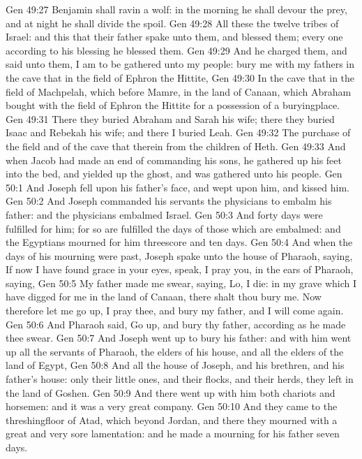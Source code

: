 \vs Gen 49:27 Benjamin shall ravin  a wolf: in the morning he shall devour the prey, and at night he shall divide the spoil.
\vs Gen 49:28 All these  the twelve tribes of Israel: and this  that their father spake unto them, and blessed them; every one according to his blessing he blessed them.
\vs Gen 49:29 And he charged them, and said unto them, I am to be gathered unto my people: bury me with my fathers in the cave that  in the field of Ephron the Hittite,
\vs Gen 49:30 In the cave that  in the field of Machpelah, which  before Mamre, in the land of Canaan, which Abraham bought with the field of Ephron the Hittite for a possession of a buryingplace.
\vs Gen 49:31 There they buried Abraham and Sarah his wife; there they buried Isaac and Rebekah his wife; and there I buried Leah.
\vs Gen 49:32 The purchase of the field and of the cave that  therein  from the children of Heth.
\vs Gen 49:33 And when Jacob had made an end of commanding his sons, he gathered up his feet into the bed, and yielded up the ghost, and was gathered unto his people.
\vs Gen 50:1 And Joseph fell upon his father's face, and wept upon him, and kissed him.
\vs Gen 50:2 And Joseph commanded his servants the physicians to embalm his father: and the physicians embalmed Israel.
\vs Gen 50:3 And forty days were fulfilled for him; for so are fulfilled the days of those which are embalmed: and the Egyptians mourned for him threescore and ten days.
\vs Gen 50:4 And when the days of his mourning were past, Joseph spake unto the house of Pharaoh, saying, If now I have found grace in your eyes, speak, I pray you, in the ears of Pharaoh, saying,
\vs Gen 50:5 My father made me swear, saying, Lo, I die: in my grave which I have digged for me in the land of Canaan, there shalt thou bury me. Now therefore let me go up, I pray thee, and bury my father, and I will come again.
\vs Gen 50:6 And Pharaoh said, Go up, and bury thy father, according as he made thee swear.
\vs Gen 50:7 And Joseph went up to bury his father: and with him went up all the servants of Pharaoh, the elders of his house, and all the elders of the land of Egypt,
\vs Gen 50:8 And all the house of Joseph, and his brethren, and his father's house: only their little ones, and their flocks, and their herds, they left in the land of Goshen.
\vs Gen 50:9 And there went up with him both chariots and horsemen: and it was a very great company.
\vs Gen 50:10 And they came to the threshingfloor of Atad, which  beyond Jordan, and there they mourned with a great and very sore lamentation: and he made a mourning for his father seven days.
